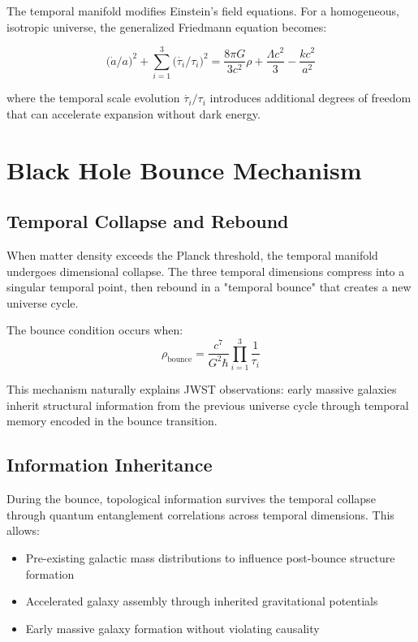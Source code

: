 \documentclass[reprint,amsmath,amssymb,aps,prd,nofootinbib]{revtex4-2}
\begin{document}
The temporal manifold modifies Einstein's field equations. For a homogeneous, isotropic universe, the generalized Friedmann equation becomes:

\begin{equation}
\bigl(\dot{a}/a\bigr)^2 + \sum_{i=1}^{3}\bigl(\dot{\tau_i}/\tau_i\bigr)^2 = \frac{8\pi G}{3c^2}\rho + \frac{\Lambda c^2}{3} - \frac{k c^2}{a^2}
\label{eq:modified_friedmann}
\end{equation}

where the temporal scale evolution $\dot{\tau_i}/\tau_i$ introduces additional degrees of freedom that can accelerate expansion without dark energy.

\section{Black Hole Bounce Mechanism}\label{sec:bounce}

\subsection{Temporal Collapse and Rebound}

When matter density exceeds the Planck threshold, the temporal manifold undergoes dimensional collapse. The three temporal dimensions compress into a singular temporal point, then rebound in a "temporal bounce" that creates a new universe cycle.

The bounce condition occurs when:
\begin{equation}
\rho_{\text{bounce}} = \frac{c^7}{G^2\hbar} \prod_{i=1}^{3}\frac{1}{\tau_i}
\label{eq:bounce_condition}
\end{equation}

This mechanism naturally explains JWST observations: early massive galaxies inherit structural information from the previous universe cycle through temporal memory encoded in the bounce transition.

\subsection{Information Inheritance}

During the bounce, topological information survives the temporal collapse through quantum entanglement correlations across temporal dimensions. This allows:

\begin{itemize}
\item Pre-existing galactic mass distributions to influence post-bounce structure formation
\item Accelerated galaxy assembly through inherited gravitational potentials
\item Early massive galaxy formation without violating causality
\end{itemize}
\end{document}
